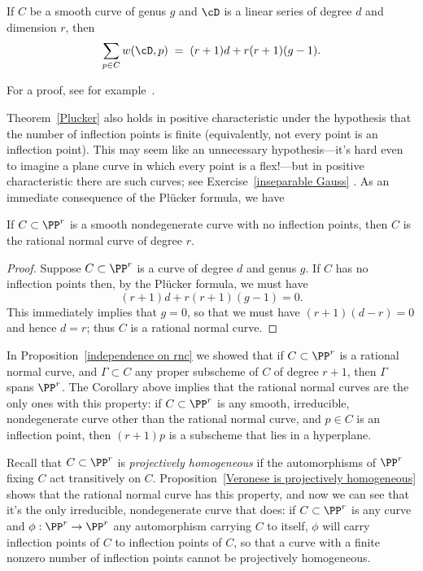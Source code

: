 \begin{theorem}\label{Plucker}
If $C$ be a smooth curve of genus $g$ and $\cD$ is a
linear series of degree $d$ and dimension $r$, then
 \begin{equation}\label{Plucker formula}
\sum_{p \in C} w(\cD, p) \; = \; (r+1)d + r(r+1)(g-1).
\end{equation}
\end{theorem}
For a proof, see for example~\cite[Theorem 7.13]{allthat}.

Theorem~\ref{Plucker} also holds in positive characteristic under the hypothesis that the number of inflection points is finite (equivalently, not every point is an inflection point). This may seem like an unnecessary hypothesis---it's hard even to imagine a plane curve in which every point is a flex!---but in positive characteristic there are such curves; see Exercise~\ref{inseparable Gauss} .
As an immediate consequence of the Pl\"ucker formula, we have

\begin{corollary}\label{uninflected curves}
 If $C\subset \PP^r$ is a smooth nondegenerate curve with no inflection points, then $C$ is the rational normal curve of degree $r$. 
\end{corollary}

\begin{proof}
Suppose $C \subset \PP^r$ is a curve of degree $d$ and genus $g$. If $C$ has no inflection points then, by the Pl\"ucker formula, we must have
$$
(r+1)d + r(r+1)(g-1) = 0.
$$
This immediately implies that $g=0$, so that we must have $(r+1)(d-r) = 0$ and hence $d=r$; thus $C$ is a rational normal curve.
\end{proof}

In Proposition~\ref{independence on rnc} we showed that if $C \subset \PP^r$ is a rational normal curve, and $\Gamma \subset C$ any proper subscheme of $C$ of degree $r+1$, then $\Gamma$ spans $\PP^r$. The Corollary above implies that the
rational normal curves are the only ones with this property:
 if $C \subset \PP^r$ is any smooth, irreducible, nondegenerate curve other than the rational normal curve,
 and $p \in C$ is an inflection point, then $(r+1)p$ is  a subscheme that lies in a hyperplane. 

Recall that $C\subset \PP^r$ is \emph{projectively homogeneous} if the automorphisms of $\PP^r$ fixing
$C$ act transitively on $C$.  Proposition~\ref{Veronese is projectively homogeneous} shows that the rational normal curve has this property, and now we can see that it's the only irreducible, nondegenerate curve that does: if $C \subset \PP^r$ is any curve and $\phi : \PP^r \to \PP^r$ any automorphism carrying $C$ to itself, $\phi$ will carry inflection points of $C$ to inflection points of $C$, so that a curve with a finite nonzero number of inflection points cannot be projectively homogeneous.

